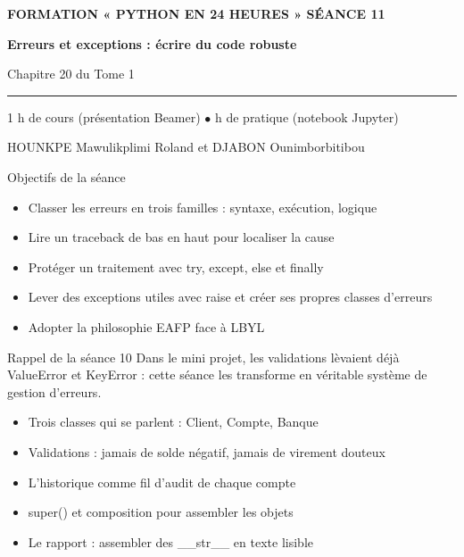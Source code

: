 \documentclass[aspectratio=169,11pt]{beamer}
\begin{document}
{%
\begin{frame}[plain]
\vspace{10mm}
{\color{PyJaune}\small\bfseries FORMATION « PYTHON EN 24 HEURES » \quad\textbar\quad SÉANCE 11\par}
\vspace{4mm}
{\color{white}\Huge\bfseries Erreurs et exceptions : écrire du code robuste\par}
\vspace{4mm}
{\color{PyBleuClair}\large Chapitre 20 du Tome 1\par}
\vspace{7mm}
{\color{PyJaune}\rule{34mm}{2.2pt}\par}
\vspace{7mm}
{\color{white}\normalsize 1 h de cours (présentation Beamer) \quad$\bullet$ h de pratique (notebook Jupyter)\par}
\vspace{2.5mm}
{\color{PyBleuClair}\normalsize HOUNKPE Mawulikplimi Roland et DJABON Ounimborbitibou\par}
\end{frame}
}
\begin{frame}{Objectifs de la séance}
\begin{itemize}
  \item Classer les erreurs en trois familles : syntaxe, exécution, logique
  \item Lire un traceback de bas en haut pour localiser la cause
  \item Protéger un traitement avec try, except, else et finally
  \item Lever des exceptions utiles avec raise et créer ses propres classes d'erreurs
  \item Adopter la philosophie EAFP face à LBYL
\end{itemize}
\end{frame}
\begin{frame}{Rappel de la séance 10}
Dans le mini projet, les validations lèvaient déjà ValueError et KeyError : cette séance les transforme en véritable système de gestion d'erreurs.

\begin{itemize}
  \item Trois classes qui se parlent : Client, Compte, Banque
  \item Validations : jamais de solde négatif, jamais de virement douteux
  \item L'historique comme fil d'audit de chaque compte
  \item super() et composition pour assembler les objets
  \item Le rapport : assembler des \_\_str\_\_ en texte lisible
\end{itemize}
\end{frame}
\end{document}
